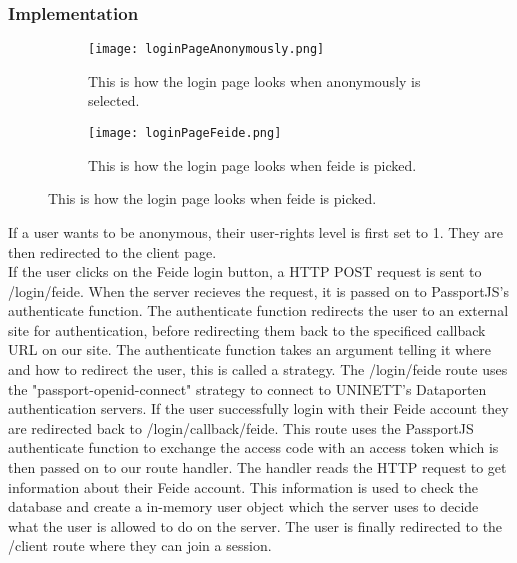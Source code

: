 \subsubsection{Implementation}
\begin{figure}[h]
    \centering
    \begin{subfigure}{0.4\linewidth}
        \texttt{[image: loginPageAnonymously.png]}
        \caption{This is how the login page looks when anonymously is selected.}
        \label{fig:loginPageAnonoumsly}
    \end{subfigure}
    \begin{subfigure}{0.4\linewidth}
        \texttt{[image: loginPageFeide.png]}
        \caption{This is how the login page looks when feide is picked.}
        \label{fig:loginPageFeide}
    \end{subfigure}
\end{figure}
\noindent
If a user wants to be anonymous, their user-rights level is first set to 1. They are then redirected to the client page.
\\[11pt]
If the user clicks on the Feide login button, a HTTP POST request is sent to /login/feide. When the server recieves the request, it is passed on to PassportJS's authenticate function. The authenticate function redirects the user to an external site for authentication, before redirecting them back to the specificed callback URL on our site. The authenticate function takes an argument telling it where and how to redirect the user, this is called a strategy. The /login/feide route uses the "passport-openid-connect" strategy to connect to UNINETT's Dataporten authentication servers. If the user successfully login with their Feide account they are redirected back to /login/callback/feide. This route uses the PassportJS authenticate function to exchange the access code with an access token which is then passed on to our route handler. The handler reads the HTTP request to get information about their Feide account. This information is used to check the database and create a in-memory user object which the server uses to decide what the user is allowed to do on the server. The user is finally redirected to the /client route where they can join a session.